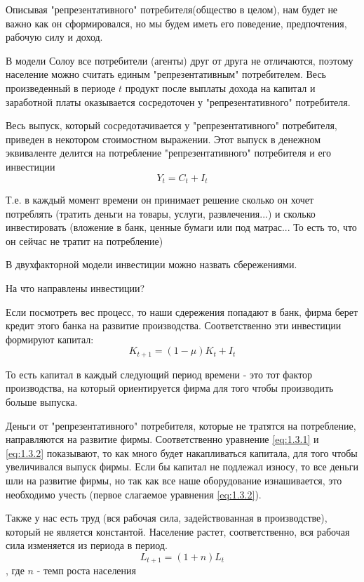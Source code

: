 \documentclass[reqno]{article}
\theoremstyle{definition}
\theoremstyle{definition}
\theoremstyle{definition}
\theoremstyle{definition}
\theoremstyle{definition}
\theoremstyle{definition}
\theoremstyle{definition}
\theoremstyle{definition}
\theoremstyle{definition}
\begin{document}
		Описывая "репрезентативного" потребителя(общество в целом), нам будет не важно как он сформировался, но мы будем иметь его поведение, предпочтения, рабочую силу и доход.
		
		В модели Солоу все потребители (агенты) друг от друга не отличаются, поэтому население можно считать единым "репрезентативным" потребителем. Весь произведенный в периоде $t$ продукт после выплаты дохода на капитал и заработной платы оказывается сосредоточен у "репрезентативного" потребителя.
		
		Весь выпуск, который сосредотачивается у "репрезентативного" потребителя, приведен в некотором стоимостном выражении. Этот выпуск в денежном эквиваленте делится на потребление "репрезентативного" потребителя и его инвестиции
		\begin{equation}\label{eq:1.3.1}
			Y_t = C_t + I_t
		\end{equation}
		
		Т.е. в каждый момент времени он принимает решение сколько он хочет потреблять (тратить деньги на товары, услуги, развлечения...) и сколько инвестировать (вложение в банк, ценные бумаги или под матрас... То есть то, что он сейчас не тратит на потребление)
		
		В двухфакторной модели инвестиции можно назвать сбережениями.\bigskip
		
		На что направлены инвестиции? 
		
		Если посмотреть вес процесс, то наши сдережения попадают в банк, фирма берет кредит этого банка на развитие производства.
		Соответственно эти инвестиции формируют капитал:
		\begin{equation}\label{eq:1.3.2}
			K_{t+1} = (1 - \mu) K_t + I_t
		\end{equation}
		
		То есть капитал в каждый следующий период времени - это тот фактор производства, на который ориентируется фирма для того чтобы производить больше выпуска.
		
		Деньги от "репрезентативного" потребителя, которые не тратятся на потребление, направляются на развитие фирмы.  Соответственно уравнение \ref{eq:1.3.1} и \ref{eq:1.3.2} показывают, то как много будет накапливаться капитала, для того чтобы увеличивался выпуск фирмы. Если бы капитал не подлежал износу, то все деньги шли на развитие фирмы, но так как все наше оборудование изнашивается, это необходимо учесть (первое слагаемое уравнения \ref{eq:1.3.2}).
		
		Также у нас есть труд (вся рабочая сила, задействованная в производстве), который не является константой. Население растет, соответственно, вся рабочая сила изменяется из периода в период. 
		\begin{equation}\label{eq:1.3.3}
			L_{t+1} = (1 + n) L_t
		\end{equation}
		, где $n$ - темп роста населения
		
\end{document}
